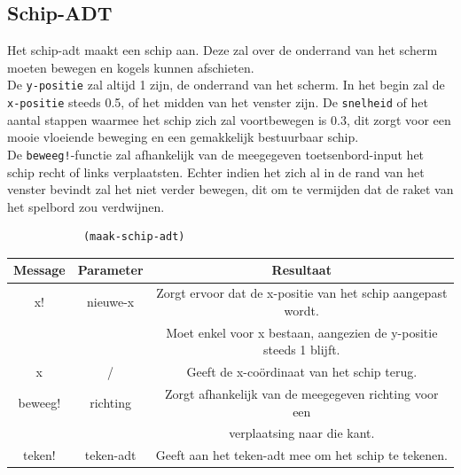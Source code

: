 \documentclass[]{article}
\begin{document}
\subsection{Schip-ADT}
Het schip-adt maakt een schip aan. Deze zal over de onderrand van het scherm moeten bewegen en kogels kunnen afschieten. \\
De \texttt{y-positie} zal altijd 1 zijn, de onderrand van het scherm. In het begin zal de \texttt{x-positie} steeds 0.5, of het midden van het venster zijn. De \texttt{snelheid} of het aantal stappen waarmee het schip zich zal voortbewegen is 0.3, dit zorgt voor een mooie vloeiende beweging en een gemakkelijk bestuurbaar schip. \\
De \texttt{beweeg!}-functie zal afhankelijk van de meegegeven toetsenbord-input het schip recht of links verplaatsten. Echter indien het zich al in de rand van het venster bevindt zal het niet verder bewegen, dit om te vermijden dat de raket van het spelbord zou verdwijnen.  
\begin{center}
		\begin{lstlisting}
			(maak-schip-adt)
		\end{lstlisting}
	\begin{tabular}{|c|c|c|}
		\hline  \textbf{Message} &\textbf{Parameter} & \textbf{Resultaat}  \\
		\hline  x! & nieuwe-x &Zorgt ervoor dat de x-positie van het schip aangepast wordt.\\ && Moet enkel voor x bestaan, aangezien de y-positie steeds 1 blijft.\\
		\hline x & /& Geeft de x-co\"{o}rdinaat van het schip terug. \\
		\hline beweeg! &richting & Zorgt afhankelijk van de meegegeven richting voor een \\ & &verplaatsing naar die kant. \\
		\hline teken! &teken-adt & Geeft aan het teken-adt mee om het schip te tekenen. \\
		\hline
	\end{tabular}
\end{center}
\end{document}
